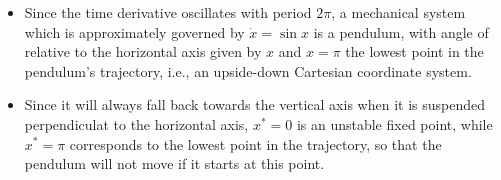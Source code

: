 \begin{itemize}
  \item[(a)] Since the time derivative oscillates with period $2\pi$,
    a mechanical system which is approximately governed by
    $\dot{x} = \sin{x}$ is a pendulum, with angle of relative to the
    horizontal axis given by $x$ and $x = \pi$ the lowest point in
    the pendulum's trajectory, i.e., an upside-down Cartesian
    coordinate system.
  \item[(b)] Since it will always fall back
    towards the vertical axis when it is suspended perpendiculat to
    the horizontal axis, $x^* = 0$ is an unstable fixed point, while
    $x^* = \pi$ corresponds to the lowest point in the trajectory,
    so that the pendulum will not move if it starts at this point.
\end{itemize}

